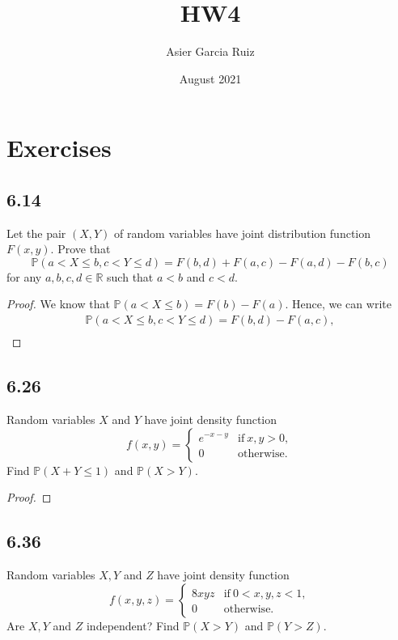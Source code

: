 \documentclass{article}
\title{HW4}
\author{Asier Garcia Ruiz }
\date{August 2021}
\newcommand{\R}{\mathbb{R}}
\renewcommand{\P}[1]{\mathbb{P}(#1)}
\begin{document}
\maketitle

\section*{Exercises}
\subsection*{6.14}
Let the pair $(X,Y)$ of random variables have joint distribution function
$F(x,y)$. Prove that
\[\P{a<X \leq b, c<Y\leq d} = F(b,d) + F(a,c) - F(a,d) - F(b,c)\]
for any $a,b,c,d \in \R$ such that $a < b$ and $c < d$.

\begin{proof}
    We know that $\P{a < X \leq b} = F(b) - F(a)$. Hence, we can write
    \begin{align*}
        \P{a<X \leq b, c<Y\leq d} = F(b,d) - F(a,c), \\
    \end{align*}
\end{proof}

\subsection*{6.26}
Random variables $X$ and $Y$ have joint density function
\begin{equation*}
    f(x,y) = \begin{cases}
        e^{-x-y} & \text{if} \ x,y > 0, \\
        0        & \text{otherwise}.
    \end{cases}
\end{equation*}
Find $\P{X+Y \leq 1}$ and $\P{X>Y}$.

\begin{proof}

\end{proof}

\subsection*{6.36}
Random variables $X,Y$ and $Z$ have joint density function
\begin{equation*}
    f(x,y,z) = \begin{cases}
        8xyz & \text{if} \ 0 < x,y,z < 1, \\
        0    & \text{otherwise}.
    \end{cases}
\end{equation*}
Are $X,Y$ and $Z$ independent? Find $\P{X>Y}$ and $\P{Y > Z}$.
\end{document}
